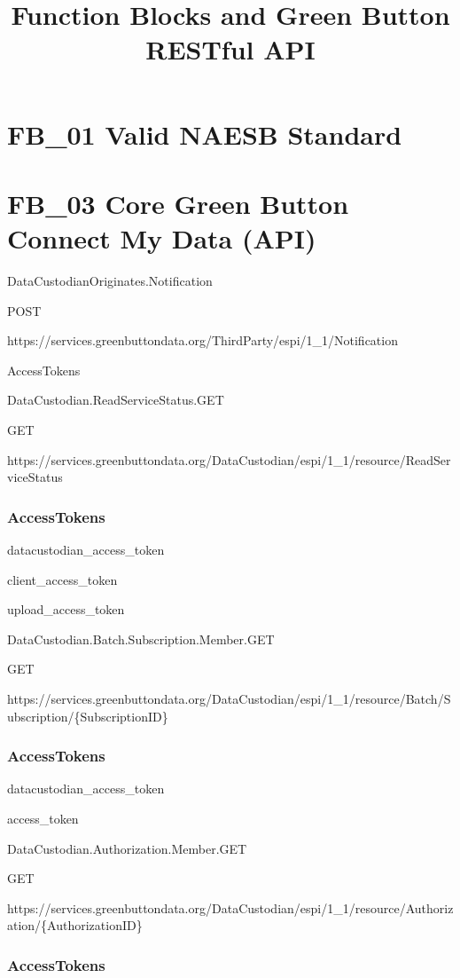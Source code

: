 \documentclass[a4paper,12pt,single,pdftex]{scrbook}
\title{Function Blocks and Green Button RESTful API}
\begin{document}
 
\maketitle
\tableofcontents
\newpage

\chapter{FB\_01 Valid NAESB Standard}
\chapter{FB\_03 Core Green Button Connect My Data (API)}


DataCustodianOriginates.Notification

POST

https://services.greenbuttondata.org/ThirdParty/espi/1\_1/Notification

AccessTokens

DataCustodian.ReadServiceStatus.GET

GET

https://services.greenbuttondata.org/DataCustodian/espi/1\_1/resource/ReadServiceStatus\subsection{AccessTokens}


datacustodian\_access\_token

client\_access\_token

upload\_access\_token

DataCustodian.Batch.Subscription.Member.GET

GET

https://services.greenbuttondata.org/DataCustodian/espi/1\_1/resource/Batch/Subscription/\{SubscriptionID\}\subsection{AccessTokens}


datacustodian\_access\_token

access\_token

DataCustodian.Authorization.Member.GET

GET

https://services.greenbuttondata.org/DataCustodian/espi/1\_1/resource/Authorization/\{AuthorizationID\}\subsection{AccessTokens}
\end{document}
